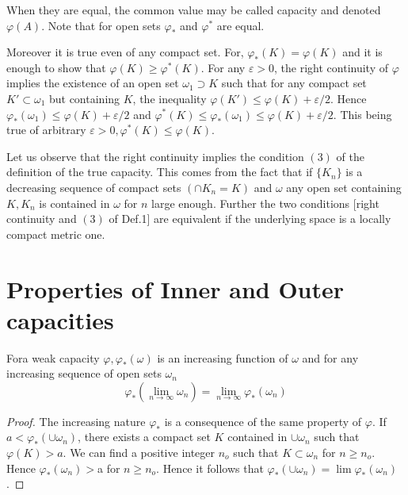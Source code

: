 When they are equal, the common value may be called capacity and denoted
$\varphi(A)$. Note that for open sets $\varphi_{*}$ and $\varphi^{*}$
are equal. 

Moreover it is true even of any compact set. For, $\varphi_{*}(K) =
\varphi(K)$ and it is enough to show that $\varphi (K) \geq
\varphi^*(K)$. For any $\varepsilon >0$, the right continuity of
$\varphi$ implies the existence of an open set $\omega_1 \supset K$
such that for any compact set $K' \subset \omega_1$ but containing
$K$, the inequality $\varphi(K') \leq \varphi(K) + \varepsilon
/2$. Hence $\varphi_{*} (\omega_1) \leq \varphi(K) + \varepsilon /2$
and $\varphi^{*}(K) \leq \varphi_{*} (\omega_1) \leq \varphi (K) +
\varepsilon /2$. This being true of arbitrary $\varepsilon > 0,
\varphi^{*}(K) \leq \varphi(K)$. 

Let us observe that the right continuity implies the condition $(3)$
of the definition of the true capacity. This comes from the fact that
if $\{K_n \}$ is a decreasing sequence of compact sets $(\cap K_n =
K)$ and $\omega$ any open set containing $K, K_n$ is contained in
$\omega$ for $n$ large enough. Further the two conditions [right
  continuity and $(3)$ of Def.1] are equivalent if the underlying
space is a locally compact metric one. 

\section{Properties of Inner and Outer capacities}\label{p2:chap2:sec3}%

\begin{prop}\label{p2:chap2:sec3:prop1} %
  For\pageoriginale a weak capacity $\varphi, \varphi_* (\omega)$ is an increasing
  function of $\omega$ and for any increasing sequence of open sets
  $\omega_n$ 
  $$
  \varphi_*\left(\lim_{n \to \infty} \omega_n\right) = \lim_{n \to
    \infty} \varphi_*(\omega_n) 
  $$
\end{prop}

\begin{proof} %
  The increasing nature $\varphi_*$ is a consequence of the same
  property of $\varphi$. If $a < \varphi_*(\cup \omega_n)$, there
  exists a compact set $K$ contained in $\cup \omega_n$ such that
  $\varphi(K)> a$. We can find a positive integer $n_o$ such that $K
  \subset \omega_n$ for $n \geq n_o$. Hence $\varphi_* (\omega_n)>$a
  for $n \geq n_o$. Hence it follows that $\varphi_* (\cup \omega_n) =
  \lim \varphi_* (\omega_n)$. 
\end{proof}


